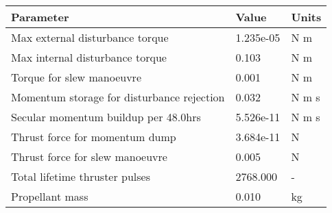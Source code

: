 \begin{tabular}{lll}
\toprule
                                  Parameter &      Value &  Units \\
\midrule
            Max external disturbance torque &  1.235e-05 &    N m \\
            Max internal disturbance torque &      0.103 &    N m \\
                  Torque for slew manoeuvre &      0.001 &    N m \\
 Momentum storage for disturbance rejection &      0.032 &  N m s \\
       Secular momentum buildup per 48.0hrs &  5.526e-11 &  N m s \\
             Thrust force for momentum dump &  3.684e-11 &      N \\
            Thrust force for slew manoeuvre &      0.005 &      N \\
             Total lifetime thruster pulses &   2768.000 &      - \\
                            Propellant mass &      0.010 &     kg \\
\bottomrule
\end{tabular}
